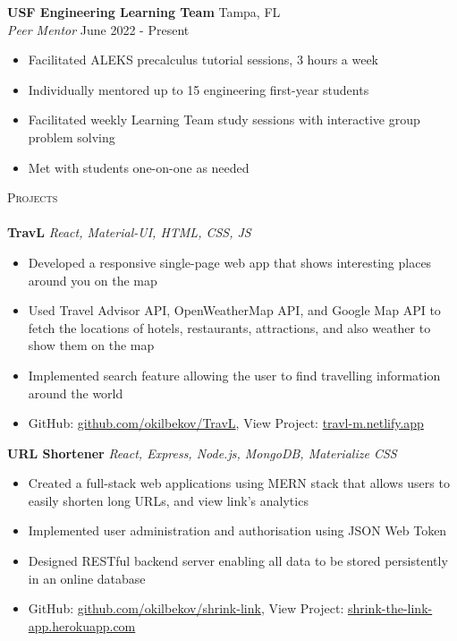 \documentclass[a4paper]{article}
\newcommand{\lineunder} {
    \vspace*{-8pt} \\
    \hspace*{-18pt} \hrulefill \\
}
\newcommand{\header} [1] {
    {\hspace*{-18pt}\vspace*{6pt} \textsc{#1}}
    \vspace*{-6pt} \lineunder
}
\begin{document}
\textbf{USF Engineering Learning Team} \hfill Tampa, FL\\
\textit{Peer Mentor} \hfill June 2022 - Present\\
\vspace{-2mm}
\begin{itemize} \itemsep 1pt
	\item Facilitated ALEKS precalculus tutorial sessions, 3 hours a week
	\vspace{-2mm}
	\item Individually mentored up to 15 engineering first-year students
	\vspace{-2mm}
	\item Facilitated weekly Learning Team study sessions with interactive group problem solving
	\vspace{-2mm}
	\item Met with students one-on-one as needed
\end{itemize}
{\Large \header{Projects}}
{\textbf{TravL}} {\sl React, Material-UI, HTML, CSS, JS}\\
\vspace{-2mm}
\begin{itemize} \itemsep 1pt
	\item Developed a responsive single-page web app that shows interesting places around you on the map
	\vspace{-2mm}
	\item Used Travel Advisor API, OpenWeatherMap API, and Google Map API to fetch the locations of hotels, restaurants, attractions, and also weather to show them on the map
	\vspace{-2mm}
	\item Implemented search feature allowing the user to find travelling information around the world
	\vspace{-2mm}
	\item GitHub: \href{https://github.com/okilbekov/TravL}{github.com/okilbekov/TravL}, View Project: \href{https://travl-m.netlify.app}{travl-m.netlify.app}
\end{itemize}
{\textbf{URL Shortener}} {\sl React, Express, Node.js, MongoDB, Materialize CSS} \\
\vspace{-2mm}
\begin{itemize} \itemsep 1pt
	\item Created a full-stack web applications using MERN stack that allows users to easily shorten long URLs, and view link's analytics
	\vspace{-2mm}
	\item Implemented user administration and authorisation using JSON Web Token
	\vspace{-2mm}
	\item Designed RESTful backend server enabling all data to be stored persistently in an online database
	\vspace{-2mm}
	\item GitHub: \href{https://github.com/okilbekov/shrink-link}{github.com/okilbekov/shrink-link}, View Project: \href{https://shrink-the-link-app.herokuapp.com}{shrink-the-link-app.herokuapp.com}
\end{itemize}
\end{document}
